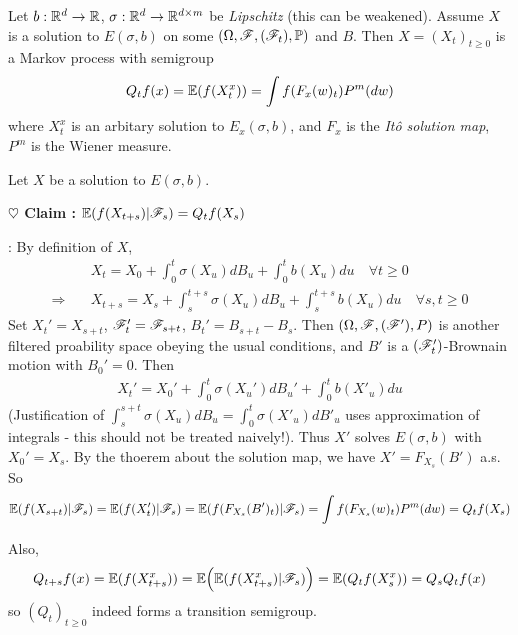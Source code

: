 \documentclass[10pt,a4paper]{article}
\newenvironment{proof}
{\begin{changemargin}{0.5cm}{0.5cm} 
	}%
	{\end{changemargin}
}
\newenvironment{subproof}
{\begin{changemargin}{0.5cm}{0.5cm} 
	}%
	{\end{changemargin}
}
\newenvironment{p}
{\begin{proof} 
	}%
	{\end{proof}
}
\begin{document}
\thm Let $b: \mathbb{R}^d \rightarrow \mathbb{R}$, $\sigma : \mathbb{R}^d \rightarrow \mathbb{R}^{d\times m}$ be \emph{Lipschitz} (this can be weakened). Assume $X$ is a solution to $E(\sigma, b)$ on some $(\Omega, \mathscr{F}, (\mathscr{F}_t), \mathbb{P})$ and $B$. Then $X= (X_t)_{t\geq 0}$ is a Markov process with semigroup
\begin{align*}
Q_t f(x) = \mathbb{E} (f(X_t^x)) = \int f(F_x(w)_t) P^m(dw)
\end{align*}
where $X_t^x$ is an arbitary solution to $E_x(\sigma,b)$, and $F_x$ is the \emph{It\^o solution map}, $P^m$ is the Wiener measure.
\begin{p}
\pf Let $X$ be a solution to $E(\sigma, b)$.

\textbf{$\heartsuit$ Claim :} $\mathbb{E}(f(X_{t+s})|\mathscr{F}_s) = Q_t f(X_s)$
\begin{subproof}
: By definition of $X$,
\begin{align*}
& X_t = X_0 + \int_0^t \sigma(X_u) dB_u + \int_0^t b(X_u) du \quad \forall t\geq 0 \\
\Rightarrow \quad & X_{t+s} = X_s + \int_s^{t+s} \sigma (X_u) dB_u + \int_s^{t+s} b(X_u) du \quad \forall s,t\geq 0
\end{align*}
Set $X_t' = X_{s+t}$, $\mathscr{F}_t' = \mathscr{F}_{s+t}$, $B_t' = B_{s+t} - B_s$. Then $(\Omega, \mathscr{F}, (\mathscr{F}'), P)$ is another filtered proability space obeying the usual conditions, and $B'$ is a $(\mathscr{F}'_t)$-Brownain motion with $B_0' =0$. Then
\begin{align*}
X_t' = X_0' + \int_0^t \sigma(X_u') dB_u' + \int_0^t b(X'_u) du 
\end{align*}
(Justification of $\int_s^{s+t} \sigma(X_u) dB_u = \int_0^t \sigma(X'_u)dB'_u$ uses approximation of integrals - this should not be treated naively!). Thus $X'$ solves $E(\sigma, b)$ with $X_0' = X_s$. By the thoerem about the solution map, we have $X' = F_{X_s} (B')$ a.s. So
\begin{align*}
\mathbb{E}(f(X_{s+t})|\mathscr{F}_s) = \mathbb{E}(f(X_t') | \mathscr{F}_s) = \mathbb{E}(f(F_{X_s}(B')_t) |\mathscr{F}_s) = \int f(F_{X_s}(w)_t) P^m(dw) = Q_t f(X_s)
\end{align*}
\end{subproof}
Also, 
\begin{align*}
Q_{t+s} f(x) = \mathbb{E} (f(X_{t+s}^x)) = \mathbb{E}\Big( \mathbb{E}(f(X_{t+s}^x) | \mathscr{F}_s) \Big) = \mathbb{E} (Q_t f(X_s^x)) = Q_s Q_t f(x)
\end{align*}
so $(Q_t)_{t\geq 0}$ indeed forms a transition semigroup.

\eop
\end{p}
\s
\end{document}
